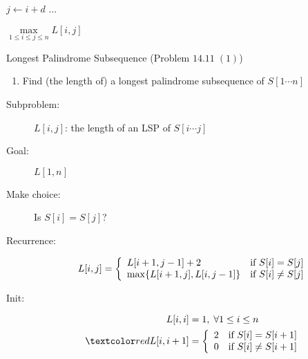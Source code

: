 \begin{frame}{}
  \centerline{}

  \pause
  \vspace{0.30cm}
  \begin{center}
    \begin{minipage}{0.50\textwidth}
      \begin{algorithmic}
	    \State $j \gets i + d$
		\State $\dots$
	  \EndFor
	\EndFor

	\State \Return $\max\limits_{1 \le i \le j \le n} L[i,j]$
      \end{algorithmic}
    \end{minipage}
  \end{center}
\end{frame}
\begin{frame}{}
  \begin{exampleblock}{Longest Palindrome Subsequence (Problem $14.11\; (1)$)}
    \begin{enumerate}[(1)]
      \item Find (the length of) a longest palindrome subsequence of $S[1 \cdots n]$
    \end{enumerate}
  \end{exampleblock}

  \begin{description}
	\item[Subproblem:] $L[i,j]$: the length of an LSP of $S[i \cdots j]$
	\item[Goal:] $L[1,n]$
	  \pause
	\item[Make choice:] Is $S[i] = S[j]$?
	\item[Recurrence:] 
	  \begin{displaymath}
		L[i,j] = \left\{ \begin{array}{ll}
		  L[i+1, j-1] + 2 & \text{if } S[i] = S[j]  \\
		  \max\{L[i+1,j], L[i,j-1]\} & \text{if } S[i] \neq S[j]
		\end{array} \right.
	  \end{displaymath}
	  \pause
	\item[Init:]
	  \begin{align*}
		L[i,i] &= 1, \; \forall 1 \le i \le n  \\
		\red{L[i,i+1]} &= \left\{ \begin{array}{ll}
		  2 & \text{if } S[i] = S[i+1]  \\
		  0 & \text{if } S[i] \neq S[i+1]
		  \end{array} \right.
	  \end{align*}
  \end{description}
\end{frame}
